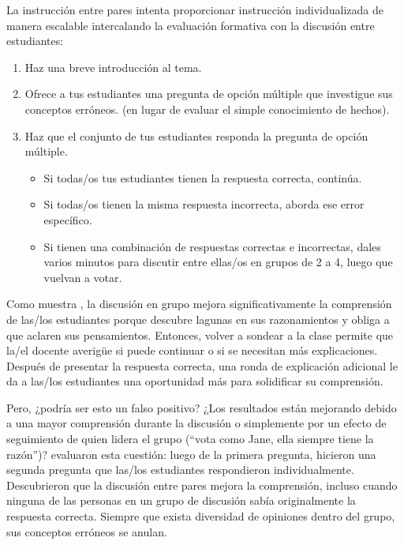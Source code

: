 La instrucción entre pares intenta proporcionar instrucción individualizada de manera escalable
intercalando la evaluación formativa con la discusión entre estudiantes:

\begin{enumerate}

\item
  Haz una breve introducción al tema.

\item
  Ofrece a tus estudiantes una pregunta de opción múltiple que investigue sus conceptos erróneos.
  (en lugar de evaluar el simple conocimiento de hechos).

\item
  Haz que el conjunto de tus estudiantes responda la pregunta de opción múltiple.

  \begin{itemize}

  \item
    Si todas/os tus estudiantes tienen la respuesta correcta, continúa.

  \item
    Si todas/os tienen la misma respuesta incorrecta,
    aborda ese error específico.

  \item
    Si tienen una combinación de respuestas correctas e incorrectas,
    dales varios minutos para discutir entre ellas/os en grupos de 2 a 4,
    luego que vuelvan a votar.

  \end{itemize}

\end{enumerate}

Como muestra
,
la discusión en grupo mejora significativamente la comprensión de las/los estudiantes
porque descubre lagunas en sus razonamientos y obliga a que aclaren sus pensamientos.
Entonces, volver a sondear a la clase permite que la/el docente averigüe si puede continuar
o si se necesitan más explicaciones.
Después de presentar la respuesta correcta,
una ronda de explicación adicional le da a las/los estudiantes una oportunidad más para solidificar su comprensión.

Pero, ¿podría ser esto un falso positivo?
¿Los resultados están mejorando debido a una mayor comprensión durante la discusión
o simplemente por un efecto de seguimiento de quien lidera el grupo (``vota como Jane, ella siempre tiene la razón'')?
\cite{Smit2009} evaluaron esta cuestión: luego de la primera pregunta,
hicieron una segunda pregunta
que las/los estudiantes respondieron individualmente.
Descubrieron que la discusión entre pares mejora la comprensión,
incluso cuando ninguna de las personas en un grupo de discusión sabía originalmente la respuesta correcta.
Siempre que exista diversidad de opiniones dentro del grupo,
sus conceptos erróneos se anulan.

